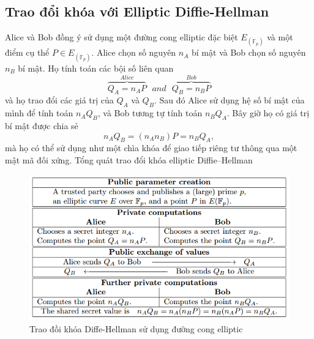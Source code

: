 \documentclass[a4paper,12pt]{report}
\begin{document}
\subsection*{Trao đổi khóa với Elliptic Diffie-Hellman}
Alice và Bob đồng ý sử dụng một đường cong elliptic đặc biệt $E_(\mathbb{F}_p)$ và một điểm cụ thể $P \in E_(\mathbb{F}_p)$. Alice chọn số nguyên $n_A$ bí mật và Bob chọn số nguyên $n_B$ bí mật. Họ tính toán các bội số liên quan
\begin{displaymath}
\overbrace{Q_A = n_AP}^{Alice} \ \ \ and \ \ \ \overbrace{Q_B = n_BP}^{Bob}
\end{displaymath}
và họ trao đổi các giá trị của $Q_A$ và $Q_B$. Sau đó Alice sử dụng hệ số bí mật của mình để tính toán $n_AQ_B$, và Bob tương tự tính toán $n_BQ_A$. Bây giờ họ có giá trị bí mật được chia sẻ
\begin{displaymath}
n_AQ_B = (n_An_B)P = n_BQ_A,
\end{displaymath}
mà họ có thể sử dụng như một chìa khóa để giao tiếp riêng tư thông qua một mật mã đối xứng. Tổng quát trao đổi khóa elliptic Diffie–Hellman
\begin{figure}[H]
\begin{center}
\includegraphics[scale=0.9]{../im7.png}
\caption{Trao đồi khóa Diffe-Hellman sử dụng đường cong elliptic}
\end{center}
\end{figure}
\end{document}
